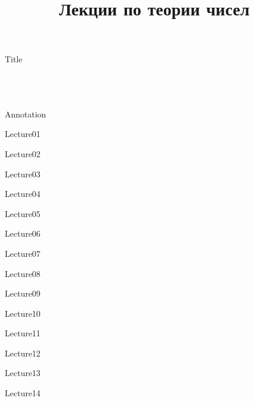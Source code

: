 \documentclass[11pt]{article}
\DeclareMathOperator{\Ree}{Re}
\DeclareMathOperator{\Imm}{Im}
\begin{document}
\title{Лекции по теории чисел}

\theoremstyle{plain}
\newtheorem{theorem}{Теорема}[section]
\newtheorem{hypothesis}{Гипотеза}[section]
\newtheorem{lemma}[theorem]{Лемма}
\newtheorem{proposition}[theorem]{Предложение}
\newtheorem{corollary}{Следствие}
\newtheorem*{note}{Замечание}
\newtheorem{problem}{Задача}[section]
\newtheorem*{test}{Признак}

\theoremstyle{definition}
\newtheorem{definition}{Определение}[subsection]
\newtheorem{example}{Пример}[section]
\newtheorem{statement}{Утверждение}[section]

\theoremstyle{remark}
\newtheorem*{rem}{Замечание}

\newenvironment{solution}
  {\renewcommand\qedsymbol{$\blacksquare$}\begin{proof}[Решение]}
  {\end{proof}}

\renewcommand{\leq}{\leqslant}
\renewcommand{\geq}{\geqslant}

\renewcommand{\phi}{\varphi}
\renewcommand{\epsilon}{\varepsilon}

\renewcommand{\Re}{\Ree}
\renewcommand{\Im}{\Imm}

\thispagestyle{empty}

{Title}

\newpage
~\\~\\~\\
{Annotation}


\newpage

\tableofcontents

\newpage


{Lecture01}

{Lecture02}

{Lecture03}

{Lecture04}

{Lecture05}

{Lecture06}

{Lecture07}

{Lecture08}

{Lecture09}

{Lecture10}

{Lecture11}

{Lecture12}

{Lecture13}

{Lecture14}
\end{document}
